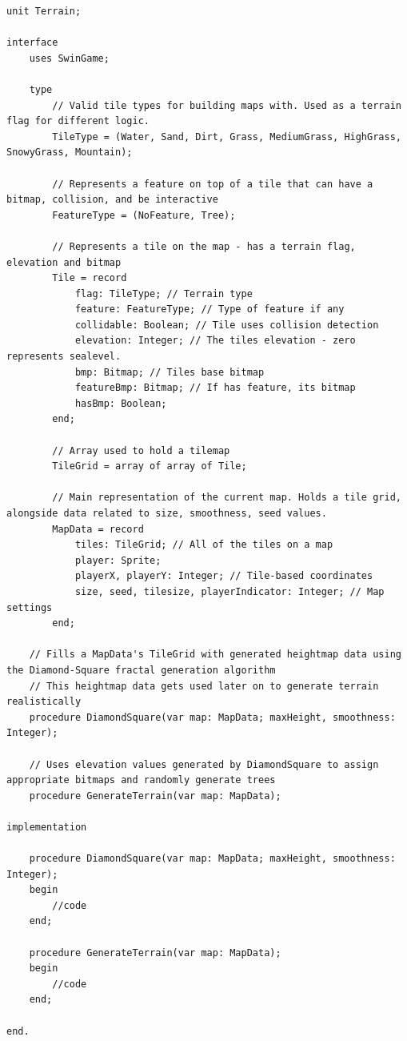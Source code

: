 \documentclass{article}
\begin{document}
\begin{mdframed}[topline=false,bottomline=false,backgroundcolor=darkgray]
\begin{verbatim}
unit Terrain;

interface
	uses SwinGame;

	type
		// Valid tile types for building maps with. Used as a terrain flag for different logic.
		TileType = (Water, Sand, Dirt, Grass, MediumGrass, HighGrass, SnowyGrass, Mountain);

		// Represents a feature on top of a tile that can have a bitmap, collision, and be interactive
		FeatureType = (NoFeature, Tree);

		// Represents a tile on the map - has a terrain flag, elevation and bitmap
		Tile = record
			flag: TileType; // Terrain type
			feature: FeatureType; // Type of feature if any
			collidable: Boolean; // Tile uses collision detection
			elevation: Integer; // The tiles elevation - zero represents sealevel.
			bmp: Bitmap; // Tiles base bitmap
			featureBmp: Bitmap; // If has feature, its bitmap
			hasBmp: Boolean;
		end;

		// Array used to hold a tilemap
		TileGrid = array of array of Tile;

		// Main representation of the current map. Holds a tile grid, alongside data related to size, smoothness, seed values.
		MapData = record
			tiles: TileGrid; // All of the tiles on a map
			player: Sprite;
			playerX, playerY: Integer; // Tile-based coordinates
			size, seed, tilesize, playerIndicator: Integer; // Map settings
		end;

	// Fills a MapData's TileGrid with generated heightmap data using the Diamond-Square fractal generation algorithm
	// This heightmap data gets used later on to generate terrain realistically
	procedure DiamondSquare(var map: MapData; maxHeight, smoothness: Integer);

	// Uses elevation values generated by DiamondSquare to assign appropriate bitmaps and randomly generate trees
	procedure GenerateTerrain(var map: MapData);
	
implementation

	procedure DiamondSquare(var map: MapData; maxHeight, smoothness: Integer);
	begin
		//code
	end;

	procedure GenerateTerrain(var map: MapData);
	begin
		//code
	end;

end.
\end{verbatim}
\end{mdframed}
\end{document}
